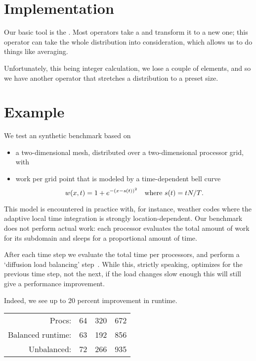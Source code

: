 \documentclass[11pt,fleqn,preprint]{impreport}
\begin{document}
\section{Implementation}

Our basic tool is the .
Most operators take a  and transform it to a new
one; this operator can take the whole distribution into consideration,
which allows us to do things like averaging.


Unfortunately, this being integer calculation, we lose a couple of
elements, and so we have another operator that stretches a
distribution to a preset size.


\section{Example}

We test an synthetic benchmark based on
\begin{itemize}
\item a two-dimensional mesh, distributed over a two-dimensional
  processor grid, with
\item work per grid point that is modeled by a time-dependent bell curve
  \[ w(x,t) = 1+e^{-(x-s(t))^2} \quad \hbox{where $s(t)=tN/T$.} \]
\end{itemize}

This model is encountered in practice with, for instance, weather
codes where the adaptive local time integration is strongly
location-dependent.  Our benchmark does not perform actual work: each
processor evaluates the total amount of work for its subdomain and
sleeps for a proportional amount of time.

After each time step we evaluate the total time per processors, and
perform a `diffusion load balancing'
step~\cite{Cybenko:1989:balancing,HuBlake:diffusion1999}. While this,
strictly speaking, optimizes for the previous time step, not the next,
if the load changes slow enough this will still give a performance
improvement.

Indeed, we see up to 20 percent improvement in runtime.

\begin{tabular}{|r|r|r|r|}
  \hline
  Procs:&64&320&672\\
  Balanced runtime:&63&192&856\\
  Unbalanced:&72&266&935\\
  \hline
\end{tabular}
\end{document}
